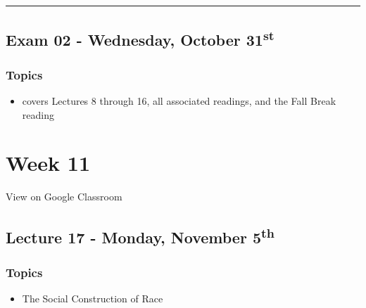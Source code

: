 \documentclass[]{book}
\providecommand{\tightlist}{%
  \setlength{\itemsep}{0pt}\setlength{\parskip}{0pt}}
\theoremstyle{definition}
\theoremstyle{definition}
\theoremstyle{definition}
\theoremstyle{remark}
\begin{document}
\begin{center}\rule{0.5\linewidth}{\linethickness}\end{center}

\hypertarget{exam-02---wednesday-october-31st}{%
\subsection*{\texorpdfstring{Exam 02 - Wednesday, October
31\textsuperscript{st}}{Exam 02 - Wednesday, October 31st}}\label{exam-02---wednesday-october-31st}}

\hypertarget{topics-19}{%
\subsubsection*{Topics}\label{topics-19}}

\begin{itemize}
\tightlist
\item
  covers Lectures 8 through 16, all associated readings, and the Fall
  Break reading
\end{itemize}

\hypertarget{week-11}{%
\section*{Week 11}\label{week-11}}

View on Google Classroom

\hypertarget{lecture-17---monday-november-5th}{%
\subsection*{\texorpdfstring{Lecture 17 - Monday, November
5\textsuperscript{th}}{Lecture 17 - Monday, November 5th}}\label{lecture-17---monday-november-5th}}

\hypertarget{topics-20}{%
\subsubsection*{Topics}\label{topics-20}}

\begin{itemize}
\tightlist
\item
  The Social Construction of Race
\end{itemize}
\end{document}
